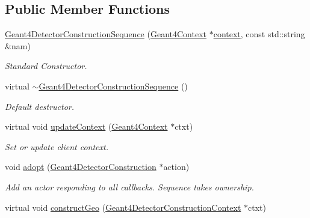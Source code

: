 \subsection*{Public Member Functions}
\begin{DoxyCompactItemize}
\item 
\hyperlink{class_d_d4hep_1_1_simulation_1_1_geant4_detector_construction_sequence_abd65d829a42c5d6e403349c9ffbb13d1}{Geant4\+Detector\+Construction\+Sequence} (\hyperlink{class_d_d4hep_1_1_simulation_1_1_geant4_context}{Geant4\+Context} $\ast$\hyperlink{class_d_d4hep_1_1_simulation_1_1_geant4_action_aa9d87f0ec2a72b7fc2591b18f98d75cf}{context}, const std\+::string \&nam)
\begin{DoxyCompactList}\small\item\em Standard Constructor. \end{DoxyCompactList}\item 
virtual \hyperlink{class_d_d4hep_1_1_simulation_1_1_geant4_detector_construction_sequence_a417d49c67bf4903def46532f17dd7d20}{$\sim$\+Geant4\+Detector\+Construction\+Sequence} ()
\begin{DoxyCompactList}\small\item\em Default destructor. \end{DoxyCompactList}\item 
virtual void \hyperlink{class_d_d4hep_1_1_simulation_1_1_geant4_detector_construction_sequence_a2ccfc854d0b38a4b1547422c2779e346}{update\+Context} (\hyperlink{class_d_d4hep_1_1_simulation_1_1_geant4_context}{Geant4\+Context} $\ast$ctxt)
\begin{DoxyCompactList}\small\item\em Set or update client context. \end{DoxyCompactList}\item 
void \hyperlink{class_d_d4hep_1_1_simulation_1_1_geant4_detector_construction_sequence_a883d0336b5983474af9479c03e90a35b}{adopt} (\hyperlink{class_d_d4hep_1_1_simulation_1_1_geant4_detector_construction}{Geant4\+Detector\+Construction} $\ast$action)
\begin{DoxyCompactList}\small\item\em Add an actor responding to all callbacks. Sequence takes ownership. \end{DoxyCompactList}\item 
virtual void \hyperlink{class_d_d4hep_1_1_simulation_1_1_geant4_detector_construction_sequence_a7c2512ab15fa66370409585d60becc99}{construct\+Geo} (\hyperlink{class_d_d4hep_1_1_simulation_1_1_geant4_detector_construction_context}{Geant4\+Detector\+Construction\+Context} $\ast$ctxt)

\end{DoxyCompactItemize}
